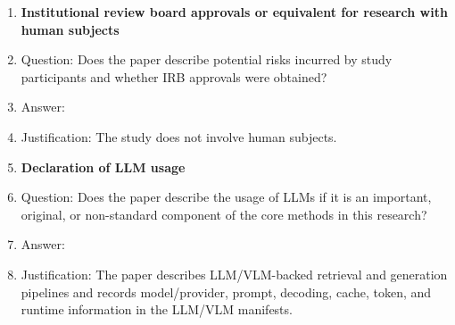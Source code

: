 \begin{enumerate}
\item {\bf Institutional review board approvals or equivalent for research with human subjects}
\item[] Question: Does the paper describe potential risks incurred by study participants and whether IRB approvals were obtained?
\item[] Answer: \answerNA{}
\item[] Justification: The study does not involve human subjects.

\item {\bf Declaration of LLM usage}
\item[] Question: Does the paper describe the usage of LLMs if it is an important, original, or non-standard component of the core methods in this research?
\item[] Answer: \answerYes{}
\item[] Justification: The paper describes LLM/VLM-backed retrieval and generation pipelines and records model/provider, prompt, decoding, cache, token, and runtime information in the LLM/VLM manifests.

\end{enumerate}
